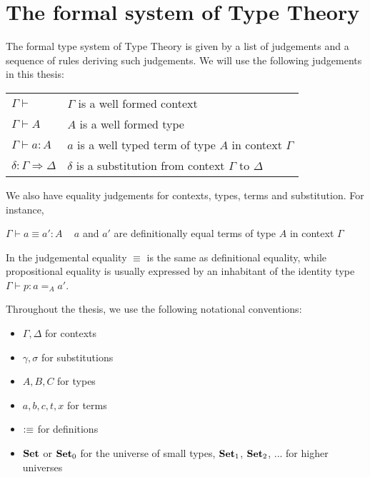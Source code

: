 \section{The formal system of Type Theory}

The formal type system of Type Theory is given by a list of judgements and a sequence of rules deriving such judgements. We will use the following judgements in this thesis:


\begin{tabular}{l l}
$\Gamma \vdash$ & $\Gamma$  is a well formed context \\
$\Gamma \vdash A$ & $A$  is a well formed type \\
$\Gamma \vdash a : A$ & $a$ is a well typed term of type $A$ in context $\Gamma$ \\
$\delta : \Gamma \Rightarrow \Delta$ & $\delta$ is a substitution from context $\Gamma$ to $\Delta$ \\
\end{tabular}

We also have equality judgements for contexts, types, terms and substitution. For instance,

$\Gamma \vdash a \equiv a' : A$  ~ $a$ and $a'$ are definitionally equal terms of type $A$ in context $\Gamma$

In \itt the judgemental equality $\equiv$ is the same as definitional equality, while propositional equality is usually expressed by an inhabitant of the identity type $\Gamma \vdash p: a =_{A} a' $.


Throughout the thesis, we use the following notational conventions:

\begin{itemize}
\item $\Gamma, \Delta$ for contexts

\item $\gamma, \sigma$ for substitutions

\item $A, B, C$ for types

\item $a, b, c, t, x$ for terms

\item $\vcentcolon\equiv$ for definitions

\item $\operatorname{\mathbf{Set}}$ or $\operatorname{\mathbf{Set}}_0$ for the universe of small types, $\operatorname{\mathbf{Set}}_1$, $\operatorname{\mathbf{Set}}_2$, ... for higher universes

\end{itemize}

